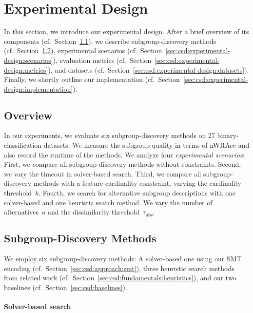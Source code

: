 \documentclass{article}
\theoremstyle{definition}
\begin{document}
\section{Experimental Design}
\label{sec:csd:experimental-design}

In this section, we introduce our experimental design.
After a brief overview of its components (cf.~Section~\ref{sec:csd:experimental-design:overview}), we describe subgroup-discovery methods (cf.~Section~\ref{sec:csd:experimental-design:methods}), experimental scenarios (cf.~Section~\ref{sec:csd:experimental-design:scenarios}), evaluation metrics (cf.~Section~\ref{sec:csd:experimental-design:metrics}), and datasets (cf.~Section~\ref{sec:csd:experimental-design:datasets}).
Finally, we shortly outline our implementation (cf.~Section~\ref{sec:csd:experimental-design:implementation}).

\subsection{Overview}
\label{sec:csd:experimental-design:overview}

In our experiments, we evaluate six subgroup-discovery methods on 27 binary-classification datasets.
We measure the subgroup quality in terms of nWRAcc and also record the runtime of the methods.
We analyze four \emph{experimental scenarios}:
First, we compare all subgroup-discovery methods without constraints.
Second, we vary the timeout in solver-based search.
Third, we compare all subgroup-discovery methods with a feature-cardinality constraint, varying the cardinality threshold~$k$.
Fourth, we search for alternative subgroup descriptions with one solver-based and one heuristic search method.
We vary the number of alternatives~$a$ and the dissimilarity threshold~$\tau_{\text{abs}}$.

\subsection{Subgroup-Discovery Methods}
\label{sec:csd:experimental-design:methods}

We employ six subgroup-discovery methods:
A solver-based one using our SMT encoding (cf.~Section~\ref{sec:csd:approach:smt}), three heuristic search methods from related work (cf.~Section~\ref{sec:csd:fundamentals:heuristics}), and our two baselines (cf.~Section~\ref{sec:csd:baselines}).

\paragraph{Solver-based search}
\end{document}
